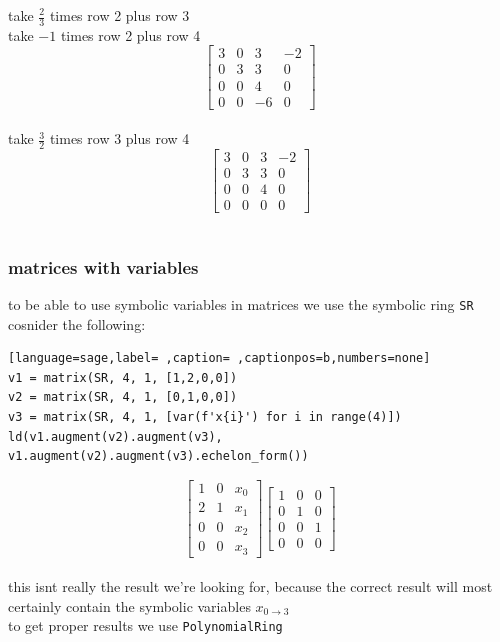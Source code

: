\documentclass[a4paper,12pt]{article}
\begin{document}
take \(\frac{2}{3}\) times row 2 plus row 3\\[0pt]
take \(-1\) times row 2 plus row 4\\[0pt]
\[\left[\begin{array}{rrrr} 3 & 0 & 3 & -2 \\ 0 & 3 & 3 & 0 \\ 0 & 0 & 4 & 0 \\ 0 & 0 & -6 & 0 \end{array}\right]\]\\[0pt]
take \(\frac{3}{2}\) times row 3 plus row 4\\[0pt]
\[\left[\begin{array}{rrrr} 3 & 0 & 3 & -2 \\ 0 & 3 & 3 & 0 \\ 0 & 0 & 4 & 0 \\ 0 & 0 & 0 & 0 \end{array}\right]\]\\[0pt]
\subsubsection{matrices with variables}
\label{sec:org29c164e}
to be able to use symbolic variables in matrices we use the symbolic ring \texttt{SR}\\[0pt]
cosnider the following:\\[0pt]
\begin{lstlisting}[language=sage,label= ,caption= ,captionpos=b,numbers=none]
v1 = matrix(SR, 4, 1, [1,2,0,0])
v2 = matrix(SR, 4, 1, [0,1,0,0])
v3 = matrix(SR, 4, 1, [var(f'x{i}') for i in range(4)])
ld(v1.augment(v2).augment(v3), v1.augment(v2).augment(v3).echelon_form())
\end{lstlisting}

\[\left[\begin{array}{rrr} 1 & 0 & x_{0} \\ 2 & 1 & x_{1} \\ 0 & 0 & x_{2} \\ 0 & 0 & x_{3} \end{array}\right] \left[\begin{array}{rrr} 1 & 0 & 0 \\ 0 & 1 & 0 \\ 0 & 0 & 1 \\ 0 & 0 & 0 \end{array}\right]\]\\[0pt]

this isnt really the result we're looking for, because the correct result will most certainly contain the symbolic variables \(x_{0\rightarrow 3}\)\\[0pt]
to get proper results we use \texttt{PolynomialRing}\\[0pt]
\end{document}
